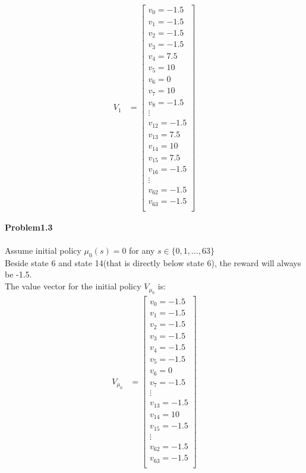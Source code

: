 \documentclass{article}
\begin{document}
\begin{align}
V_1 &= \begin{bmatrix}
    v_0=-1.5 \\
    v_1=-1.5 \\
    v_2=-1.5 \\
    v_3=-1.5 \\
    v_4=7.5 \\
    v_5=10 \\
    v_6=0 \\
    v_7=10 \\
    v_8=-1.5 \\
    \vdots \\
    v_{12}=-1.5 \\
    v_{13}=7.5 \\
    v_{14}=10 \\
    v_{15}=7.5 \\
    v_{16}=-1.5 \\
    \vdots \\
    v_{62}=-1.5 \\
    v_{63}=-1.5 \\
    \end{bmatrix}
\end{align}

\textbf{Problem1.3} \\ \\
Assume initial policy $\mu_0(s) = 0$ for any $s \in \{0, 1, \dots, 63\}$ \\
Beside state 6 and state 14(that is directly below state 6), the reward will always be -1.5. \\
The value vector for the initial policy $V_{\mu_0}$ is: \\

\begin{align}
V_{\mu_0} &= \begin{bmatrix}
    v_0=-1.5 \\
    v_1=-1.5 \\
    v_2=-1.5 \\
    v_3=-1.5 \\
    v_4=-1.5 \\
    v_5=-1.5 \\
    v_6=0 \\
    v_7=-1.5 \\
    \vdots \\
    v_{13}=-1.5 \\
    v_{14}=10 \\
    v_{15}=-1.5 \\
    \vdots \\
    v_{62}=-1.5 \\
    v_{63}=-1.5 \\
        \end{bmatrix}
\end{align}
\end{document}
